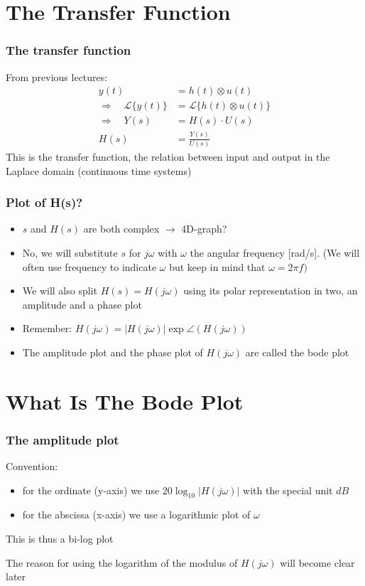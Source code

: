 
\section{The Transfer Function}


\begin{frame}
\frametitle{The transfer function}

From previous lectures:
\begin{align*}
    y(t) &= h(t) \otimes u(t)  \\
    \Rightarrow \quad 
    \mathscr{L}\{y(t)\} &= \mathscr{L}\{h(t) \otimes u(t)\}  \\
    \Rightarrow \quad
    Y(s) &= H(s) \cdot U(s)\\
    H(s) &= \frac{Y(s)}{U(s)}
\end{align*}
This is the transfer function, the relation between input and output in the Laplace domain (continuous time systems)


\end{frame}

\begin{frame}
\frametitle{Plot of H(s)?}

\begin{itemize}
\item $s$ and $H(s)$ are both complex $\rightarrow$ 4D-graph?
\item No, we will substitute $s$ for $j\omega$ with $\omega$ the angular frequency [rad/s].
(We will often use frequency to indicate $\omega$ but keep in mind that $\omega = 2\pi f)$
\item We will also split $H(s) = H(j\omega)$ using its polar representation in two, an amplitude and a phase plot
\item Remember: $H(j\omega) = |H(j\omega)| \exp\angle(H(j\omega))$ 
\item The amplitude plot and the phase plot of $H(j\omega)$ are called the bode plot

\end{itemize}
\end{frame}


\section{What Is The Bode Plot}

\begin{frame}
\frametitle{The amplitude plot}

Convention: 
\begin{itemize}
\item for the ordinate (y-axis) we use $20\log_{10}|H(j\omega)|$ with the special unit $dB$
\item for the abscissa (x-axis) we use a logarithmic plot of $\omega$

\end{itemize}
This is thus a bi-log plot

The reason for using the logarithm of the modulus of $H(j\omega)$ will become clear later

\end{frame}




